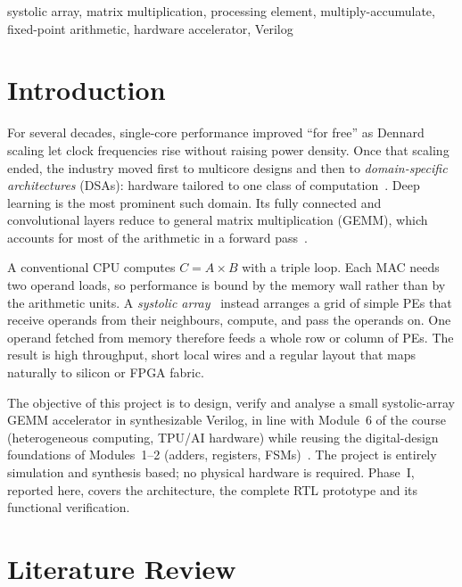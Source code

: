 \documentclass[conference]{IEEEtran}
\begin{document}
\begin{IEEEkeywords}
systolic array, matrix multiplication, processing element, multiply-accumulate,
fixed-point arithmetic, hardware accelerator, Verilog
\end{IEEEkeywords}

\section{Introduction}
For several decades, single-core performance improved ``for free'' as
Dennard scaling let clock frequencies rise without raising power density.
Once that scaling ended, the industry moved first to multicore designs and
then to \emph{domain-specific architectures} (DSAs): hardware tailored to one
class of computation~\cite{hennessy2019golden}. Deep learning is the most
prominent such domain. Its fully connected and convolutional layers reduce
to general matrix multiplication (GEMM), which accounts for most of the
arithmetic in a forward pass~\cite{sze2017efficient}.

A conventional CPU computes $C=A\times B$ with a triple loop. Each MAC needs
two operand loads, so performance is bound by the memory wall rather than
by the arithmetic units. A \emph{systolic array}~\cite{kung1979systolic,kung1982why}
instead arranges a grid of simple PEs that receive operands from their
neighbours, compute, and pass the operands on. One operand fetched from
memory therefore feeds a whole row or column of PEs. The result is high
throughput, short local wires and a regular layout that maps naturally to
silicon or FPGA fabric.

The objective of this project is to design, verify and analyse a small
systolic-array GEMM accelerator in synthesizable Verilog, in line with
Module~6 of the course (heterogeneous computing, TPU/AI hardware) while
reusing the digital-design foundations of Modules~1--2 (adders, registers,
FSMs)~\cite{harris_ddca,patterson_cod}. The project is entirely simulation and synthesis based; no physical
hardware is required. Phase~I, reported here, covers the architecture, the
complete RTL prototype and its functional verification.

\section{Literature Review}
\end{document}
